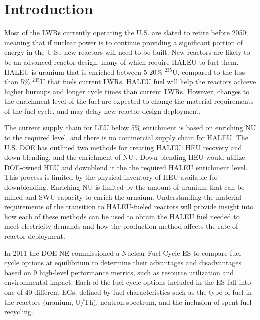 \section{Introduction}

Most of the \glspl{LWR} currently operating the U.S. are slated to retire
before 2050; meaning that if nuclear power is to continue providing a 
significant portion of energy in the U.S., new reactors will need to be built. 
New reactors are likely to be an advanced reactor design, many of 
which require \gls{HALEU} to fuel them. \gls{HALEU} is uranium that 
is enriched between 5-20\% $^{235}$U, compared to the less than 5\% $^{235}$U 
that fuels current \glspl{LWR}. \gls{HALEU} fuel will help 
the reactors achieve higher burnups and longer cycle times than current 
\glspl{LWR}. However, changes to the enrichment level of the fuel are 
expected 
to change the material requirements of the fuel cycle, and may delay 
new reactor design deployment.

The current supply chain for \gls{LEU} below 5\% enrichment is based on 
enriching \gls{NU} to the required level, and there is no commercial 
supply chain for \gls{HALEU}. The U.S. \gls{DOE} has outlined 
two methods for creating \gls{HALEU}: \gls{HEU} recovery and down-blending, 
and the enrichment of \gls{NU} \cite{griffith_overview_2020}. 
Down-blending \gls{HEU} would utilize \gls{DOE}-owned \gls{HEU} and 
downblend it the the required \gls{HALEU} enrichment level. This 
process is 
limited by the physical inventory of \gls{HEU} available for downblending. 
Enriching \gls{NU} is limited by the amount of uranium that can be 
mined and \gls{SWU} capacity to enrich the urnaium. Understanding the 
material requirements of the transition to \gls{HALEU}-fueled 
reactors will provide insight into how each of these methods can be used 
to obtain the \gls{HALEU} fuel needed to meet electricity demands and 
how the production method affects the rate of reactor deployment.

In 2011 the \gls{DOE-NE} commissioned a Nuclear Fuel Cycle \gls{ES} 
\cite{wigeland_nuclear_2014} to compare fuel cycle options at equilibrium
to determine their advantages and disadvantages
based on 9 high-level performance metrics, such as resource utilization and 
environmental impact. Each of the fuel cycle options included in the 
\gls{ES} fall into one of 40 different \glspl{EG}, defined by fuel 
characteristics such as the type of fuel in the reactors (uranium, 
U/Th), neutron spectrum, and the inclusion of spent fuel recycling. 

